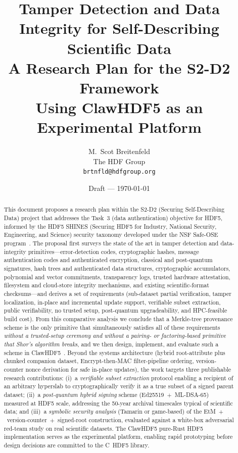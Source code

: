 \documentclass[11pt]{article}
\title{%
  \textbf{Tamper Detection and Data Integrity for Self-Describing Scientific Data}\\[0.5em]
  \large A Research Plan for the S2-D2 Framework\\
  Using ClawHDF5 as an Experimental Platform
}
\author{
  M.~Scot Breitenfeld\\
  The HDF Group\\
  \texttt{brtnfld@hdfgroup.org}
}
\date{Draft --- \today}
\begin{document}
\maketitle

\begin{abstract}
This document proposes a research plan within the S2-D2
(Securing Self-Describing Data) project that addresses the Task~3
(data authentication) objective for HDF5, informed by the HDF5
SHINES (Securing HDF5 for Industry, National Security, Engineering,
and Science) security taxonomy developed under the NSF Safe-OSE
program~\cite{shines}. The proposal first surveys the state of the art in
tamper detection and data-integrity primitives---error-detection codes,
cryptographic hashes, message authentication codes and authenticated
encryption, classical and post-quantum signatures, hash trees and
authenticated data structures, cryptographic accumulators, polynomial and
vector commitments, transparency logs, trusted hardware attestation,
filesystem and cloud-store integrity mechanisms, and existing scientific-format
checksums---and derives a set of requirements (sub-dataset partial verification,
tamper localization, in-place and incremental update support, verifiable subset
extraction, public verifiability, no trusted setup, post-quantum upgradeability,
and HPC-feasible build cost). From this comparative analysis we conclude that
a Merkle-tree provenance scheme is the only primitive that simultaneously
satisfies all of these requirements \emph{without a trusted-setup ceremony and
without a pairing- or factoring-based primitive that Shor's algorithm breaks},
and we then design,
implement, and evaluate such a scheme in ClawHDF5~\cite{clawhdf5}. Beyond
the systems architecture (hybrid root-attribute plus chunked companion
dataset, Encrypt-then-MAC filter-pipeline ordering, version-counter nonce
derivation for safe in-place updates), the work targets three publishable
research contributions: (i)~a \emph{verifiable subset extraction} protocol
enabling a recipient of an arbitrary hyperslab to cryptographically verify it
as a true subset of a signed parent dataset; (ii)~a \emph{post-quantum hybrid
signing} scheme (Ed25519~$+$~ML-DSA-65) measured at HDF5 scale, addressing the
50-year archival timescales typical of scientific data; and (iii)~a
\emph{symbolic security analysis} (Tamarin or game-based) of the
EtM~$+$~version-counter~$+$~signed-root construction, evaluated against a
white-box adversarial red-team study on real scientific datasets. The ClawHDF5
pure-Rust HDF5 implementation serves as the experimental platform, enabling
rapid prototyping before design decisions are committed to the C~HDF5 library.
\end{abstract}
\end{document}
